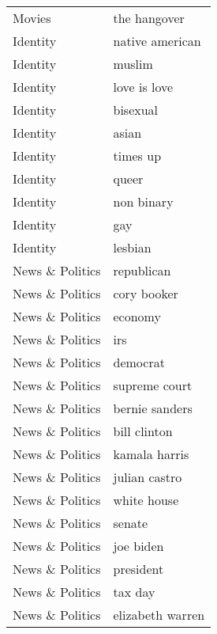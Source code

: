 \begin{supertabular}{l p{0.25\textwidth}}
           Movies &                       the hangover \\
         Identity &                    native american \\
         Identity &                             muslim \\
         Identity &                       love is love \\
         Identity &                           bisexual \\
         Identity &                              asian \\
         Identity &                           times up \\
         Identity &                              queer \\
         Identity &                         non binary \\
         Identity &                                gay \\
         Identity &                            lesbian \\
  News \& Politics &                         republican \\
  News \& Politics &                        cory booker \\
  News \& Politics &                            economy \\
  News \& Politics &                                irs \\
  News \& Politics &                           democrat \\
  News \& Politics &                      supreme court \\
  News \& Politics &                     bernie sanders \\
  News \& Politics &                       bill clinton \\
  News \& Politics &                      kamala harris \\
  News \& Politics &                      julian castro \\
  News \& Politics &                        white house \\
  News \& Politics &                             senate \\
  News \& Politics &                          joe biden \\
  News \& Politics &                          president \\
  News \& Politics &                            tax day \\
  News \& Politics &                   elizabeth warren \\

\end{supertabular}
